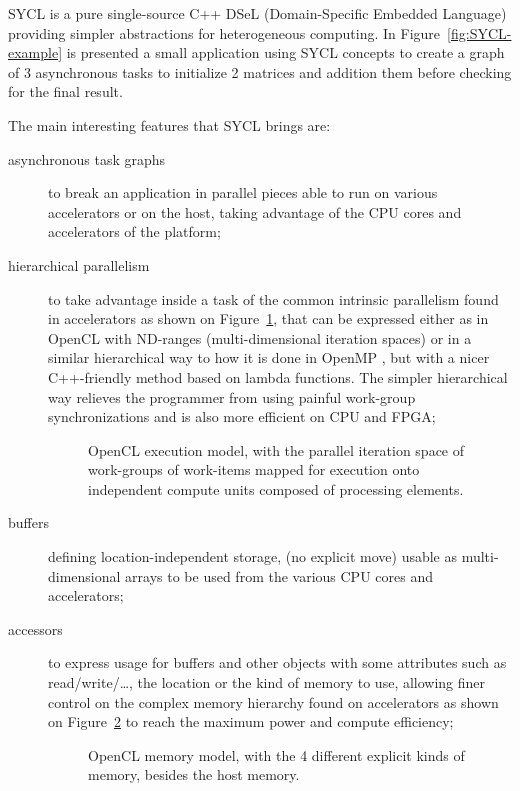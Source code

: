 \documentclass[sigplan, review, authordraft]{acmart}
\begin{document}
SYCL is a pure single-source C++ DSeL (Domain-Specific Embedded
Language) providing simpler abstractions for heterogeneous
computing. In Figure~\ref{fig:SYCL-example} is presented a small
application using SYCL concepts to create a graph of 3 asynchronous
tasks to initialize 2 matrices and addition them before checking for
the final result.

The main interesting features that SYCL brings are:
\begin{description}

\item[asynchronous task graphs] to break an application in parallel
  pieces able to run on various accelerators or on the host, taking
  advantage of the CPU cores and accelerators of the platform;

\item[hierarchical parallelism] to take advantage inside a task of the
  common intrinsic parallelism found in accelerators as shown on
  Figure~\ref{fig:OpenCL-execution-model}, that can be expressed
  either as in OpenCL with ND-ranges (multi-dimensional iteration
  spaces) or in a similar hierarchical way to how it is done in OpenMP
  \cite{OpenMP-5.0-preview-1}, but with a nicer C++-friendly method
  based on lambda functions. The simpler hierarchical way relieves the
  programmer from using painful work-group synchronizations and is
  also more efficient on CPU and FPGA;

  \begin{figure}
    \caption{OpenCL execution model, with the parallel iteration space
      of work-groups of work-items mapped for execution onto independent
    compute units composed of processing elements.}
    \label{fig:OpenCL-execution-model}
  \end{figure}

\item[buffers] defining location-independent storage, (no explicit
  move) usable as multi-dimensional arrays to be used from the various
  CPU cores and accelerators;

\item[accessors] to express usage for buffers and other objects with
  some attributes such as read/write/\ldots, the location or the kind
  of memory to use, allowing finer control on the complex memory
  hierarchy found on accelerators as shown on
  Figure~\ref{fig:OpenCL-memory-model} to reach the maximum power and
  compute efficiency;

  \begin{figure}
    \caption{OpenCL memory model, with the 4 different explicit kinds
      of memory, besides the host memory.}
    \label{fig:OpenCL-memory-model}
  \end{figure}


\end{description}
\end{document}
